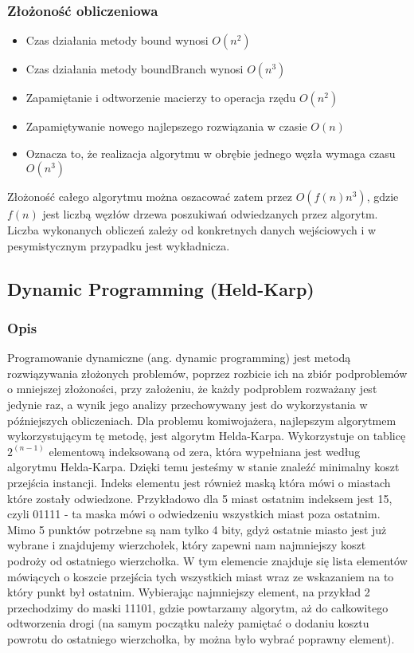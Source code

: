 \documentclass[12pt,a4paper,titlepage]{article}
\begin{document}
\subsubsection{Złożoność obliczeniowa}
\begin{itemize}
    \item Czas działania metody bound wynosi $O(n^2)$
    \item Czas działania metody boundBranch wynosi $O(n^3)$
    \item Zapamiętanie i odtworzenie macierzy to operacja rzędu $O(n^2)$
    \item Zapamiętywanie nowego najlepszego rozwiązania w czasie $O(n)$
    \item Oznacza to, że realizacja algorytmu w obrębie jednego węzła wymaga czasu $O(n^3)$
\end{itemize}
Złożoność całego algorytmu można oszacować zatem przez $O(f(n)n^3)$, gdzie $f(n)$ jest liczbą węzłów drzewa poszukiwań odwiedzanych przez algorytm.
Liczba wykonanych obliczeń zależy od konkretnych danych wejściowych i w pesymistycznym przypadku jest wykładnicza.

\subsection{Dynamic Programming (Held-Karp)}
\subsubsection{Opis}
Programowanie dynamiczne (ang. dynamic programming) jest metodą rozwiązywania złożonych problemów, poprzez rozbicie ich na zbiór podproblemów o mniejszej złożoności, przy założeniu, że każdy podproblem rozważany jest jedynie raz, a wynik jego analizy przechowywany jest do wykorzystania w późniejszych obliczeniach. Dla problemu komiwojażera, najlepszym algorytmem wykorzystującym
tę metodę, jest algorytm Helda-Karpa. Wykorzystuje on tablicę $2^{(n-1)}$ elementową indeksowaną od zera, która wypełniana jest według algorytmu Helda-Karpa. Dzięki temu jesteśmy w stanie znaleźć minimalny koszt przejścia instancji. Indeks elementu jest również maską która mówi o miastach które zostały odwiedzone. Przykładowo dla 5 miast ostatnim indeksem jest 15, czyli 01111 - ta maska mówi o odwiedzeniu wszystkich miast poza ostatnim. Mimo 5 punktów potrzebne są nam tylko 4 bity, gdyż ostatnie miasto jest już wybrane i znajdujemy wierzchołek, który zapewni nam najmniejszy koszt podroży od ostatniego wierzchołka. W tym elemencie znajduje się lista elementów mówiących o koszcie przejścia tych wszystkich miast wraz ze wskazaniem na to który punkt był ostatnim. Wybierając najmniejszy element, na przykład 2 przechodzimy do maski 11101, gdzie powtarzamy algorytm, aż do całkowitego odtworzenia drogi (na samym początku należy pamiętać o dodaniu kosztu powrotu do ostatniego wierzchołka, by można było wybrać poprawny element).
\end{document}
